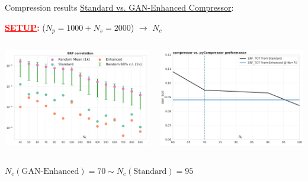 \begin{frame}{Compression results}
	\underline{Standard vs. GAN-Enhanced Compressor}:
	\begin{center}
		\textcolor{red}{\textbf{\underline{SETUP}:}} ($N_p=1000 + N_s=2000$) 
		$\longrightarrow$ $N_c$
	\end{center}
	\begin{columns}[T] 
	\begin{column}{.5\textwidth}
	\includegraphics[width=\linewidth]{./gan_compressor/imgs/erf-validation.pdf}
	\end{column}
	\begin{column}{.5\textwidth}	
	\includegraphics[width=\linewidth]{./gan_compressor/imgs/performance.pdf}
	\end{column}
	\end{columns}
	\begin{center}
	\begin{tcolorbox}[width=9.5cm, halign=center, colframe=HallowGreen]
		$N_c (\text{GAN-Enhanced})=70 \sim N_c (\text{Standard})=95$
	\end{tcolorbox}
	\end{center}
\end{frame}
